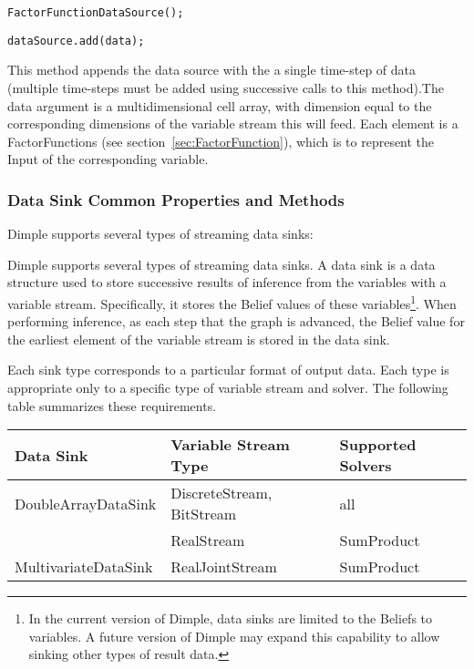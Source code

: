 \ifjava
\begin{lstlisting}
FactorFunctionDataSource();
\end{lstlisting}
\fi




\begin{lstlisting}
dataSource.add(data);
\end{lstlisting}

This method appends the data source with the a single time-step of data (multiple time-steps must be added using successive calls to this method).The data argument is a multidimensional \ifmatlab cell \fi array, with dimension equal to the corresponding dimensions of the variable stream this will feed.  Each element is a FactorFunctions (see section~\ref{sec:FactorFunction}), which is to represent the Input of the corresponding variable.


\subsubsection{Data Sink Common Properties and Methods}
\label{sec:DataSink}

Dimple supports several types of streaming data sinks:

Dimple supports several types of streaming data sinks.  A data sink is a data structure used to store successive results of inference from the variables with a variable stream.  Specifically, it stores the Belief values of these variables\footnote{In the current version of Dimple, data sinks are limited to the Beliefs to variables.  A future version of Dimple may expand this capability to allow sinking other types of result data.}.  When performing inference, as each step that the graph is advanced, the Belief value for the earliest element of the variable stream is stored in the data sink.

Each sink type corresponds to a particular format of output data.  Each type is appropriate only to a specific type of variable stream and solver.  The following table summarizes these requirements.

\begin{longtable} {l | l | l}
Data Sink & Variable Stream Type & Supported Solvers \\
\hline
\endhead
DoubleArrayDataSink & DiscreteStream, BitStream & all \\
 & RealStream & SumProduct \\
MultivariateDataSink & RealJointStream & SumProduct \\
\end{longtable} 

